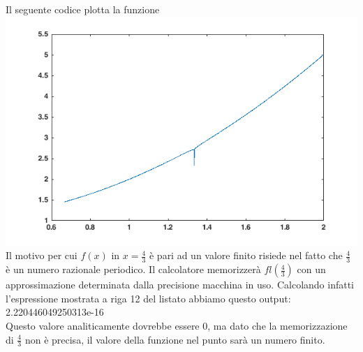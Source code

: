 Il seguente codice plotta la funzione \\

\includegraphics[scale=0.8]{cap_1/es13/es13.png}\\
Il  motivo per cui $f(x)$ in $x=\frac{4}{3}$ è pari ad un valore finito risiede nel fatto che $\frac{4}{3}$ è un numero razionale periodico.
Il calcolatore memorizzerà $fl(\frac{4}{3})$ con un approssimazione determinata dalla precisione macchina in uso.
Calcolando infatti l'espressione mostrata a riga 12 del listato abbiamo questo output:\\   2.220446049250313e-16\\
Questo valore analiticamente dovrebbe essere 0, ma dato che la memorizzazione di $\frac{4}{3}$ non è precisa, il valore della funzione nel punto sarà un numero finito.
